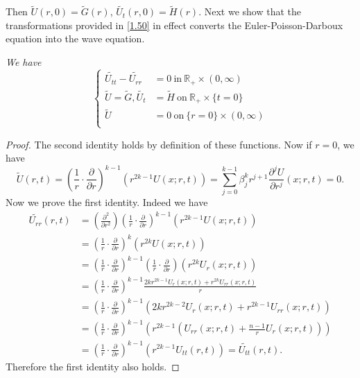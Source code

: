 Then $\widetilde{U}(r,0)=\widetilde{G}(r)$, $\widetilde{U_t}(r,0)=\widetilde{H}(r)$. Next we show that the transformations provided in \eqref{1.50} in effect converts the Euler-Poisson-Darboux equation into the wave equation.
\begin{lemma}\em
We have 
$$
\left\{ \begin{aligned}
	\widetilde{U_{tt}}-\widetilde{U_{rr}}&=0\ \text{in}\ \mathbb{R}_+\times(0,\infty)\\
	\widetilde{U}=\widetilde{G},\widetilde{U_t}&=\widetilde{H}\ \text{on}\ \mathbb{R}_+\times\{t=0\}\\
	\widetilde{U}&=0\ \text{on}\ \{r=0\}\times(0,\infty)\\
\end{aligned} \right. 
$$
\end{lemma}
\begin{proof}
The second identity holds by definition of these functions. Now if $r=0$, we have 
$$
\widetilde{U}\left( r,t \right) =\left( \frac{1}{r}\cdot \frac{\partial}{\partial r} \right) ^{k-1}\left( r^{2k-1}U\left( x;r,t \right) \right) =\sum_{j=0}^{k-1}{\beta _{j}^{k}r^{j+1}\frac{\partial ^jU}{\partial r^j}\left( x;r,t \right)}=0.
$$
Now we prove the first identity. Indeed we have 
$$
\begin{aligned}
\widetilde{U_{rr}}\left( r,t \right) &=\left( \frac{\partial ^2}{\partial r^2} \right) \left( \frac{1}{r}\cdot \frac{\partial}{\partial r} \right) ^{k-1}\left( r^{2k-1}U\left( x;r,t \right) \right) 
\\
&=\left( \frac{1}{r}\cdot \frac{\partial}{\partial r} \right) ^k\left( r^{2k}U\left( x;r,t \right) \right) 
\\
&=\left( \frac{1}{r}\cdot \frac{\partial}{\partial r} \right) ^{k-1}\left( \frac{1}{r}\cdot \frac{\partial}{\partial r} \right) \left( r^{2k}U_r\left( x;r,t \right) \right) 
\\
&=\left( \frac{1}{r}\cdot \frac{\partial}{\partial r} \right) ^{k-1}\frac{2kr^{2k-1}U_r\left( x;r,t \right) +r^{2k}U_{rr}\left( x;r,t \right)}{r}
\\
&=\left( \frac{1}{r}\cdot \frac{\partial}{\partial r} \right) ^{k-1}\left( 2kr^{2k-2}U_r\left( x;r,t \right) +r^{2k-1}U_{rr}\left( x;r,t \right) \right) 
\\
&=\left( \frac{1}{r}\cdot \frac{\partial}{\partial r} \right) ^{k-1}\left( r^{2k-1}\left( U_{rr}\left( x;r,t \right) +\frac{n-1}{r}U_r\left( x;r,t \right) \right) \right) 
\\
&=\left( \frac{1}{r}\cdot \frac{\partial}{\partial r} \right) ^{k-1}\left( r^{2k-1}U_{tt}\left( r,t \right) \right) =\widetilde{U_{tt}}\left( r,t \right) .
\end{aligned}
$$
Therefore the first identity also holds.
\end{proof}
